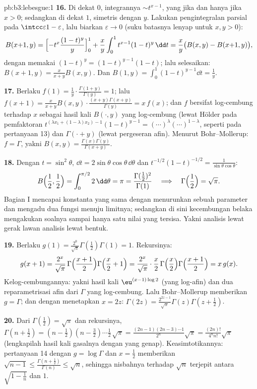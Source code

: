 \begin{solution}{pb:b3:lebesgue:1}
\textbf{16.} Di dekat $0$, integrannya $\sim t^{x-1}$, yang
 jika dan hanya jika $x > 0$; sedangkan di dekat $1$, simetris dengan $y$.
Lakukan pengintegralan parsial pada $\intcc\varepsilon{1-\varepsilon}$,
lalu biarkan $\varepsilon \to 0$ (suku batasnya lenyap untuk $x, y >
0$):
\[
B(x{+}1, y) = \Bigl[-t^x\frac{(1-t)^y}y\Bigr]_0^1 +
\frac xy\int_0^1t^{x-1}(1-t)^y\,\dd t
= \frac xy\bigl(B(x, y) - B(x{+}1, y)\bigr),
\]
dengan memakai $(1-t)^y = (1-t)^{y-1}(1 - t)$; lalu selesaikan: $B(x+1, y) =
\frac{x}{x+y}B(x, y)$. Dan $B(1, y) =
\int_0^1(1-t)^{y-1}\dd t = \frac1y$.

\textbf{17.} Berlaku $f(1) = \frac1y\cdot\frac{\Gamma(1+y)}{\Gamma(y)}
= 1$; lalu $f(x+1) = \frac{x}{x+y}B(x,y)\cdot\frac{(x+y)\Gamma(x+y)}
{\Gamma(y)} = x\,f(x)$; dan $f$ bersifat log-cembung terhadap $x$ sebagai
hasil kali $B(\cdot, y)$ yang log-cembung (lewat Hölder pada
pemfaktoran $t^{(\lambda x_1 + (1-\lambda)x_2)-1}(1-t)^{y-1}
= (\cdots)^\lambda(\cdots)^{1-\lambda}$, seperti pada pertanyaan 13)
dan $\Gamma(\cdot + y)$ (lewat pergeseran afin). Menurut Bohr--Mollerup: $f =
\Gamma$, yakni $B(x, y) =
\frac{\Gamma(x)\Gamma(y)}{\Gamma(x+y)}$.

\textbf{18.} Dengan $t = \sin^2\theta$, $\dd t =
2\sin\theta\cos\theta\,\dd\theta$ dan $t^{-1/2}(1-t)^{-1/2} =
\frac1{\sin\theta\cos\theta}$:
\[
B\Bigl(\frac12, \frac12\Bigr) =
\int_0^{\pi/2}2\,\dd\theta = \pi
= \frac{\Gamma(\frac12)^2}{\Gamma(1)}
\quad\Longrightarrow\quad
\Gamma\Bigl(\frac12\Bigr) = \sqrt\pi .
\]
Bagian I mencapai konstanta yang sama dengan menurunkan sebuah
parameter dan mengadu dua fungsi menuju limitnya; sedangkan di sini
kecembungan belaka mengakukan soalnya sampai hanya satu nilai yang
tersisa. Yakni analisis lewat gerak lawan analisis lewat bentuk.

\textbf{19.} Berlaku $g(1) = \frac{2^0}{\sqrt\pi}\Gamma(\frac12)
\Gamma(1) = 1$. Rekursinya:
\[
g(x+1) = \frac{2^{x}}{\sqrt\pi}\,
\Gamma\Bigl(\frac{x+1}2\Bigr)\Gamma\Bigl(\frac x2 + 1\Bigr)
= \frac{2^{x}}{\sqrt\pi}\cdot\frac x2\,
\Gamma\Bigl(\frac x2\Bigr)\Gamma\Bigl(\frac{x+1}2\Bigr)
= x\,g(x) .
\]
Kelog-cembungannya: yakni hasil kali $\eu^{(x-1)\log2}$ (yang log-afin) dan
dua reparametrisasi afin dari $\Gamma$ yang log-cembung.
Lalu Bohr--Mollerup memberikan $g = \Gamma$; dan dengan menetapkan $x = 2z$:
$\Gamma(2z) = \frac{2^{2z-1}}{\sqrt\pi}\Gamma(z)\Gamma(z +
\frac12)$.

\textbf{20.} Dari $\Gamma(\frac12) = \sqrt\pi$ dan
rekursinya, $\Gamma(n + \frac12) = (n - \frac12)(n -
\frac32)\cdots\frac12\,\sqrt\pi =
\frac{(2n-1)(2n-3)\cdots1}{2^n}\sqrt\pi =
\frac{(2n)!}{4^nn!}\sqrt\pi$ (lengkapilah hasil kali gasalnya dengan
yang genap). Keasimtotikannya: pertanyaan 14 dengan $g = \log\Gamma$
dan $x = \frac12$ memberikan $\sqrt{n-1} \leq
\frac{\Gamma(n+\frac12)}{\Gamma(n)} \leq \sqrt n$, sehingga
nisbahnya terhadap $\sqrt n$ terjepit antara $\sqrt{1 - \frac1n}$
dan $1$.


\end{solution}

